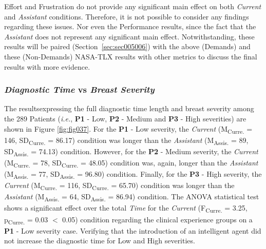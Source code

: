 Effort and Frustration do not provide any significant main effect on both {\it Current} and {\it Assistant} conditions.
Therefore, it is not possible to consider any findings regarding these issues.
Nor even the Performance results, since the fact that the {\it Assistant} does not represent any significant main effect.
Notwithstanding, these results will be paired (Section~\ref{sec:sec005006}) with the above (Demands) and these (Non-Demands) \ac{NASA-TLX} results with other metrics to discuss the final results with more evidence.

\subsubsection{{\it Diagnostic Time} vs {\it Breast Severity}}
\label{sec:sec005006001005}

The results\footnotemark[28] expressing the full diagnostic time length and breast severity among the 289 Patients ({\it i.e.}, {\bf P1} - Low, {\bf P2} - Medium and {\bf P3} - High severities) are shown in Figure \ref{fig:fig037}.
For the {\bf P1} - Low severity, the {\it Current} (M\textsubscript{Curre.} = 146, SD\textsubscript{Curre.} = 86.17) condition was longer than the {\it Assistant} (M\textsubscript{Assis.} = 89, SD\textsubscript{Assis.} = 74.13) condition.
However, for the {\bf P2} - Medium severity, the {\it Current} (M\textsubscript{Curre.} = 78, SD\textsubscript{Curre.} = 48.05) condition was, again, longer than the {\it Assistant} (M\textsubscript{Assis.} = 77, SD\textsubscript{Assis.} = 96.80) condition.
Finally, for the {\bf P3} - High severity, the {\it Current} (M\textsubscript{Curre.} = 116, SD\textsubscript{Curre.} = 65.70) condition was longer than the {\it Assistant} (M\textsubscript{Assis.} = 64, SD\textsubscript{Assis.} = 86.94) condition.
The \ac{ANOVA} statistical test shows a significant effect over the total {\it Time} for the {\it Current} (F\textsubscript{Curre.} = 3.25, p\textsubscript{Curre.} = 0.03 $<$ 0.05) condition regarding the clinical experience groups on a {\bf P1} - Low severity case.
Verifying that the introduction of an intelligent agent did not increase the diagnostic time for Low and High severities.


